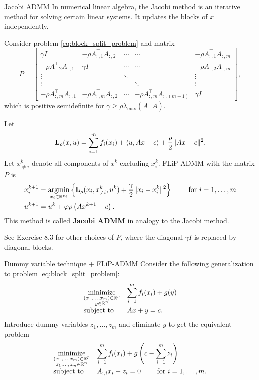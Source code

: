 \documentclass[10pt,mathserif]{beamer}
\begin{document}
\begin{frame}{Jacobi ADMM}
In numerical linear algebra, the Jacobi method is an iterative method for solving certain linear systems. It updates the blocks of $x$ independently.
\bigskip

Consider problem \eqref{eq:block_split_problem} and matrix
\[
P=
\begin{bmatrix}
\gamma I &-\rho A_{:,1}^\intercal  A_{:,2} &\cdots&\cdots&-\rho A_{:,1}^\intercal  A_{:,m}
\\
-\rho A_{:,2}^\intercal  A_{:,1}&\gamma I&\cdots&\cdots&-\rho A_{:,2}^\intercal  A_{:,m}
\\
\vdots &&\ddots&&\vdots\\
\vdots &&&\ddots&\vdots\\
-\rho A_{:,m}^\intercal  A_{:,1}&-\rho A_{:,m}^\intercal  A_{:,2}&\cdots& -\rho A_{:,m}^\intercal  A_{:,(m-1)}&\gamma I
\end{bmatrix},
\]
which is positive semidefinite for $\gamma\ge \rho \lambda_\mathrm{max}(A^\intercal  A)$.
\end{frame}

\begin{frame}
Let
\[
\mathbf{L}_\rho(x,u)=
\sum^m_{i=1}f_i(x_i)
+
\left<u,Ax-c\right>+\frac{\rho}{2}\|Ax-c\|^2.
\]
Let $x_{\neq i}^k$ denote all components of $x^k$ excluding $x_i^k$.
FLiP-ADMM with the matrix $P$ is
\begin{align*}
x^{k+1}_i &= \operatorname*{argmin}_{x_i\in \mathbb{R}^{p_i}}
\left\{\mathbf{L}_\rho (x_i,x_{\neq i}^k,u^k)+\frac{\gamma}{2}\|x_i-x_i^k\|^2\right\}
\qquad \text{ for }i=1,\dots,m
\\
u^{k+1}&=u^k+\varphi\rho \left(Ax^{k+1}-c\right).
\end{align*}
This method is called \textbf{Jacobi ADMM} in analogy to the Jacobi method.
\bigskip

See Exercise 8.3 for other choices of $P$, where the diagonal $\gamma I$ is replaced by diagonal blocks.
\end{frame}

\begin{frame}{Dummy variable technique + FLiP-ADMM}
Consider the following generalization to problem \eqref{eq:block_split_problem}:
\[
\begin{array}{ll}
\underset{\substack{(x_1,\dots,x_m)\in \mathbb{R}^p\\y\in \mathbb{R}^n}}{\mbox{minimize}}&\displaystyle{\sum^m_{i=1}f_i(x_i)}+g(y)
\\
\mbox{subject to}&Ax+y=c.
\end{array}
\]
Introduce dummy variables $z_1,\dots,z_m$ and eliminate $y$ to get the equivalent problem
\[
\begin{array}{ll}
\underset{\substack{(x_1,\dots,x_m)\in \mathbb{R}^p\\z_1,\dots,z_m\in \mathbb{R}^n}}{\mbox{minimize}}&\displaystyle{\sum^m_{i=1}f_i(x_i)}+g\left(c-\sum^m_{i=1}z_i\right)\\
\mbox{subject to}&A_{:,i}x_i-z_i=0\qquad\text{ for }i=1,\dots,m.
\end{array}
\]
\end{frame}
\end{document}

